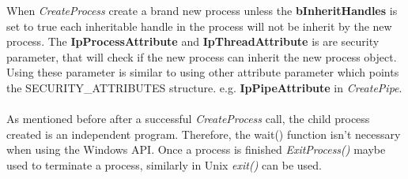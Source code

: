 \documentclass[a4paper]{article}
\begin{document}
When \textit{CreateProcess} create a brand new process unless the \textbf{bInheritHandles} is set to true each inheritable handle in the process will not be inherit by the new process. The \textbf{IpProcessAttribute} and \textbf{IpThreadAttribute} is are security parameter, that will check if the new process can inherit the new process object. Using these parameter is similar to using other attribute parameter which points the SECURITY\_ATTRIBUTES structure. e.g. \textbf{IpPipeAttribute} in \textit{CreatePipe}.\\
\\
As mentioned before after a successful \textit{CreateProcess} call, the child process created is an independent program. Therefore, the wait() function isn’t necessary when using the Windows API. Once a process is finished \textit{ExitProcess()} maybe used to terminate a process, similarly in Unix \textit{exit()} can be used.\\
\newpage
\end{document}
